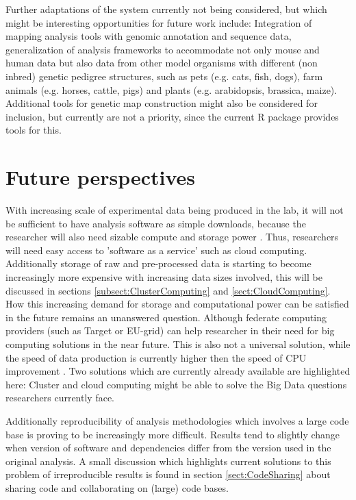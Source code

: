 Further adaptations of the system currently not being considered, but which might be interesting opportunities for 
future work include: Integration of mapping analysis tools with genomic annotation and sequence data, generalization 
of analysis frameworks to accommodate not only mouse and human data but also data from other model organisms with 
different (non inbred) genetic pedigree structures, such as pets (e.g. cats, fish, dogs), farm animals (e.g. horses, 
cattle, pigs) and plants (e.g. arabidopsis, brassica, maize). Additional tools for genetic map construction might 
also be considered for inclusion, but currently are not a priority, since the current R package provides tools for 
this.

\section{Future perspectives}
\label{sect:Future}
With increasing scale of experimental data being produced in the lab, it will not be 
sufficient to have analysis software as simple downloads, because the researcher will 
also need sizable compute and storage power \cite{Schadt:2010}. Thus, researchers will 
need easy access to 'software as a service' such as cloud computing. Additionally storage 
of raw and pre-processed data is starting to become increasingly more expensive with 
increasing data sizes involved, this will be discussed in sections \ref{subsect:ClusterComputing} 
and \ref{sect:CloudComputing}. 
How this increasing demand for storage and computational power can be satisfied in the future remains 
an unanswered question. Although federate computing providers (such as Target or EU-grid) can help 
researcher in their need for big computing solutions in the near future. This is also not a 
universal solution, while the speed of data production is currently higher then the speed of 
CPU improvement \cite{Moore:1998, Editorial:2009, Shah:2013}. Two solutions which are 
currently already available are highlighted here: Cluster and cloud computing might be able to 
solve the Big Data questions researchers currently face.

Additionally reproducibility of analysis methodologies which involves a large code base is proving 
to be increasingly more difficult. Results tend to slightly change when version of software and 
dependencies differ from the version used in the original analysis. A small discussion which highlights 
current solutions to this problem of irreproducible results is found in section \ref{sect:CodeSharing} 
about sharing code and collaborating on (large) code bases.

